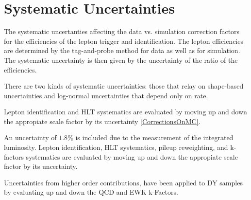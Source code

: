 \section{Systematic Uncertainties}

The systematic uncertanties affecting the data vs. simulation correction factors
for the efficiencies of the lepton trigger and identification. The lepton
efficiencies are determined by the tag-and-probe method \cite{tagandprobe} for data as well as for
simulation. The systematic uncertainty is then given by the uncertainty of
the ratio of the efficiencies.

There are two kinds of systematic uncertainties: those that relay on shape-based
uncertainties and log-normal uncertainties that depend only on rate.

Lepton identification and HLT systematics are evaluated by moving up and down
the appropiate scale factor by its uncertainty \ref{CorrectionsOnMC}.

An uncertainty of $1.8\%$ is included due to the measurement of
the integrated luminosity. Lepton identification, HLT systematics,
pileup reweighting, and k-factors systematics are evaluated by
moving up and down the appropiate scale factor by its uncertainty.

Uncertainties from higher order contributions, have been applied
to DY samples by evaluating up and down the QCD and EWK k-Factors.

